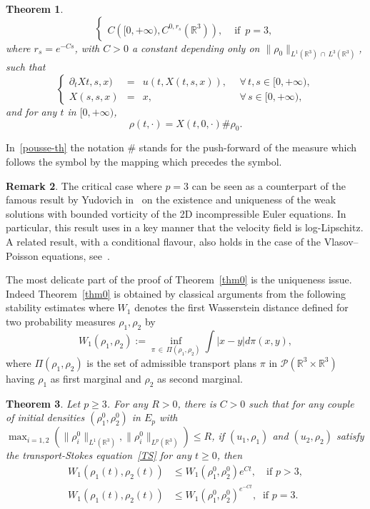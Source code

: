 \documentclass[10pt]{amsart}
\newtheorem{theo}{Theorem}[section]
\theoremstyle{definition}\newtheorem{defi}[theo]{Definition}\newtheorem{rema}[theo]{Remark}\newtheorem{exam}[theo]{Example}\newtheorem{exem}[theo]{Example}\newtheorem{nota}[theo]{Notation}
\newcommand{\R}{\mathbb{R}}
\newcommand{\clP}{\mathcal{P}}
\renewcommand{\leq}{\leqslant}
\renewcommand{\geq}{\geqslant}
\let\oldforall\forall
\renewcommand*{\forall}{\mathrel{\oldforall}}
\begin{document}
\begin{theo}
\begin{equation}
\begin{cases}
\\ {C\left([0,+\infty), C^{0,r_s} \left(\R^3\right)\right),} & \text{ if } \, p =3,
\end{cases}
\end{equation}
where $r_s = e^{-Cs} $, with $C>0$ a constant depending only on $\|\rho_0\|_{L^1(\R^3)\,\cap\,L^3(\R^3)}$, such that
\begin{equation}\label{cflow-def}
\left \{
\begin{array}{rcll}
\partial_t Xt,s,x) & = & u(t, X(t,s,x)),&\: \: \forall \, t,s\in[0,+\infty), \\
X(s,s,x) & = & x,& \: \: \forall \, s \in [0,+\infty),
\end{array}
\right.
\end{equation}
and for any $t$ in $[0,+\infty)$,
\begin{equation}\label{pousse-th}
\rho(t,\cdot) =X(t,0,\cdot) \#\rho_0.
\end{equation}
\end{theo}


In~\eqref{pousse-th} the notation $\#$ stands for the push-forward of the measure which follows the symbol by the mapping which precedes the symbol.


\begin{rema}\label{analog}
The critical case where $p=3$ can be seen as a counterpart of the famous result by Yudovich in~\cite{Yudovich63} on the existence and uniqueness of the weak solutions with bounded vorticity of the 2D incompressible Euler equations. In particular, this result uses in a key manner that the velocity field is log-Lipschitz. A related result, with a conditional flavour, also holds in the case of the Vlasov--Poisson equations, see~\cite{Loeper}.
\end{rema} The most delicate part of the proof of Theorem~\ref{thm0} is the uniqueness issue. Indeed Theorem~\ref{thm0} is obtained by classical arguments from the following stability estimates where $W_1$ denotes the first Wasserstein distance defined for two probability measures $\rho_1,\rho_2 $ by
\[
W_1 (\rho_1,\rho_2) :=
\underset{\pi\,\in\,\Pi(\rho_1,\rho_2)} \inf \int |x-y| d\pi(x,y),
\]
where $\Pi(\rho_1,\rho_2)$ is the set of admissible transport plans $\pi $ in $\clP(\R^3\times \R^3)$ having $\rho_1$ as first marginal and $\rho_2$ as second marginal.
\begin{theo} \label{thm}
Let $p\geq 3$. For any $R>0$, there is $C>0$ such that for any couple of initial densities $ (\rho_1^0, \rho_2^0)$ in $E_p $ with $ \max_{i=1,2} (\|\rho_i^0\|_{ L^1 (\R^3) },\|\rho_i^0\|_{ L^p (\R^3) }) \leq R$, if $ (u_1,\rho_1) $ and $ (u_2,\rho_2)$ satisfy the transport-Stokes equation~\eqref{TS} for any $t\geq 0$, then
\begin{align}
W_1(\rho_1(t),\rho_2(t)) &\leq W_1(\rho_1^0,\rho_2^0)e^{C t}, \quad \text{if } p > 3,\label{sta-geq-3}
\\ 
W_1 (\rho_1(t),\rho_2(t)) &\leq W_1(\rho_1^0,\rho_2^0)^{e^{-C t}}, \;\; \text{if } p = 3.\label{sta-geq-critik}
\end{align}
\end{theo}
\end{document}

